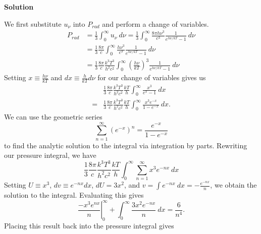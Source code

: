 \documentclass[12pt]{article}
\begin{document}
\setcounter{equation}{0}
\vspace{0.5cm}
\begin{adjustwidth}{2.5em}{0pt}
\begin{siderules}
 {\color{blue} \textbf{Solution}
 
 
 We first substitute $u_{\nu}$ into $P_{rad}$ and perform a change of variables.
 \begin{equation}
 \begin{aligned}
 P_{rad} &= \frac{1}{3}\int_{0}^{\infty} u_{\nu} ~d\nu = \frac{1}{3}\int_{0}^{\infty} \frac{8\pi h\nu^3}{c^3}\frac{1}{e^{h\nu/kT}-1} ~d\nu \\
 &= \frac{1}{3}\frac{8\pi}{c}\int_{0}^{\infty} \frac{h\nu^3}{c^3}\frac{1}{e^{h\nu/kT}-1} ~d\nu \\
 &= \frac{1}{3}\frac{8\pi}{c}\frac{k^3 T^3}{h^2 c^2} \int_{0}^{\infty} \left(\frac{h\nu}{kT}\right)^3 \frac{1}{e^{h\nu/kT}-1} ~d\nu
 \end{aligned}
 \end{equation}
 Setting $x \equiv \frac{h\nu}{kT}$ and $dx \equiv \frac{h}{kT} d\nu$ for our change of variables gives us
 \begin{equation*}
 \begin{aligned}
 & \frac{1}{3}\frac{8\pi}{c}\frac{k^3 T^3}{h^2 c^2}\frac{kT}{h} \int_{0}^{\infty} \frac{x^3}{e^x - 1} ~dx \\
 = &  \frac{1}{3}\frac{8\pi}{c}\frac{k^3 T^3}{h^2 c^2}\frac{kT}{h} \int_{0}^{\infty} \frac{x^3 e^{-x}}{1-e^{-x}} ~dx .
 \end{aligned}
 \end{equation*}
 We can use the geometric series
 \begin{equation}
 \sum_{n=1}^{\infty}(e^{-x})^n = \frac{e^{-x}}{1-e^{-x}}
 \end{equation}
 to find the analytic solution to the integral via integration by parts. Rewriting our pressure integral, we have
 \begin{equation}
 \frac{1}{3}\frac{8\pi}{c}\frac{k^3 T^3}{h^2 c^2}\frac{kT}{h} \int_{0}^{\infty}  \sum_{n=1}^{\infty} x^3 e^{-nx} ~dx
 \end{equation}
 Setting $U \equiv x^3$, $dv \equiv e^{-nx} dx$, $dU = 3x^2$, and $v = \int e^{-nx} ~dx = -\frac{e^{-nx}}{n}$, we obtain the solution to the integral. Evaluating this gives
 \begin{equation}
 \left. \frac{-x^3 e^{nx}}{n} \right |_0^{\infty} + \int_0^{\infty} \frac{3x^2 e^{-nx}}{n} ~dx = \frac{6}{n^4}.
 \end{equation}
 Placing this result back into the pressure integral gives
}
\end{siderules}
\end{adjustwidth}
\end{document}
